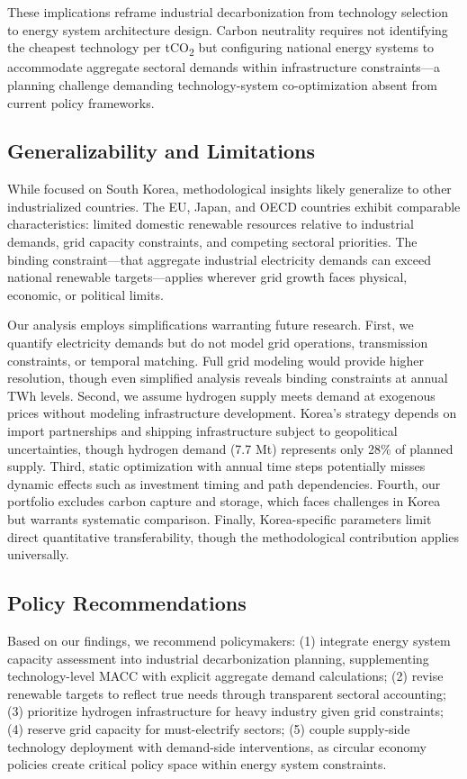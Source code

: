 \documentclass[11pt,a4paper]{article}
\begin{document}
These implications reframe industrial decarbonization from technology selection to energy system architecture design. Carbon neutrality requires not identifying the cheapest technology per tCO\textsubscript{2} but configuring national energy systems to accommodate aggregate sectoral demands within infrastructure constraints---a planning challenge demanding technology-system co-optimization absent from current policy frameworks.

\subsection{Generalizability and Limitations}

While focused on South Korea, methodological insights likely generalize to other industrialized countries. The EU, Japan, and OECD countries exhibit comparable characteristics: limited domestic renewable resources relative to industrial demands, grid capacity constraints, and competing sectoral priorities. The binding constraint---that aggregate industrial electricity demands can exceed national renewable targets---applies wherever grid growth faces physical, economic, or political limits.

Our analysis employs simplifications warranting future research. First, we quantify electricity demands but do not model grid operations, transmission constraints, or temporal matching. Full grid modeling would provide higher resolution, though even simplified analysis reveals binding constraints at annual TWh levels. Second, we assume hydrogen supply meets demand at exogenous prices without modeling infrastructure development. Korea's strategy depends on import partnerships and shipping infrastructure subject to geopolitical uncertainties, though hydrogen demand (7.7 Mt) represents only 28\% of planned supply. Third, static optimization with annual time steps potentially misses dynamic effects such as investment timing and path dependencies. Fourth, our portfolio excludes carbon capture and storage, which faces challenges in Korea but warrants systematic comparison. Finally, Korea-specific parameters limit direct quantitative transferability, though the methodological contribution applies universally.

\subsection{Policy Recommendations}

Based on our findings, we recommend policymakers: (1) integrate energy system capacity assessment into industrial decarbonization planning, supplementing technology-level MACC with explicit aggregate demand calculations; (2) revise renewable targets to reflect true needs through transparent sectoral accounting; (3) prioritize hydrogen infrastructure for heavy industry given grid constraints; (4) reserve grid capacity for must-electrify sectors; (5) couple supply-side technology deployment with demand-side interventions, as circular economy policies create critical policy space within energy system constraints.
\end{document}
